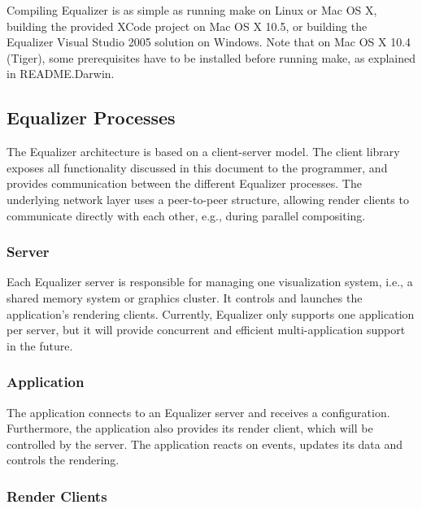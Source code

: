 \documentclass[10pt,a4]{scrartcl}
\begin{document}
Compiling Equalizer is as simple as running \textsf{make} on Linux or
Mac OS X, building the provided XCode project on Mac OS X 10.5, or
building the Equalizer Visual Studio 2005 solution on Windows. Note that
on Mac OS X 10.4 (Tiger), some prerequisites have to be installed before
running \textsf{make}, as explained in \textsf{README.Darwin}.


\subsection{Equalizer Processes}

The Equalizer architecture is based on a client-server model. The client
library exposes all functionality discussed in this document to the
programmer, and provides communication between the different Equalizer
processes. The underlying network layer uses a peer-to-peer structure,
allowing render clients to communicate directly with each other, e.g.,
during parallel compositing.

\subsubsection{Server}
Each Equalizer server is responsible for managing one visualization
system, i.e., a shared memory system or graphics cluster.  It controls
and launches the application's rendering clients.  Currently, Equalizer
only supports one application per server, but it will provide
concurrent and efficient multi-application support in the future.

\subsubsection{Application}

The application connects to an Equalizer server and receives a
configuration.  Furthermore, the application also provides its render
client, which will be controlled by the server. The application reacts
on events, updates its data and controls the rendering.

\subsubsection{Render Clients}
\end{document}
